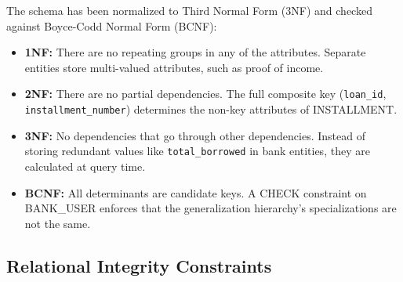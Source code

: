 \documentclass[12pt, a4paper]{report}
\begin{document}
The schema has been normalized to Third Normal Form (3NF) and checked against Boyce-Codd Normal Form (BCNF):

\begin{itemize}[noitemsep]
\item \textbf{1NF:} There are no repeating groups in any of the attributes. Separate entities store multi-valued attributes, such as proof of income.
\item \textbf{2NF:} There are no partial dependencies. The full composite key (\texttt{loan\_id}, \texttt{installment\_number}) determines the non-key attributes of INSTALLMENT.
\item \textbf{3NF:} No dependencies that go through other dependencies. Instead of storing redundant values like \texttt{total\_borrowed} in bank entities, they are calculated at query time.
\item \textbf{BCNF:} All determinants are candidate keys. A CHECK constraint on BANK\_USER enforces that the generalization hierarchy's specializations are not the same.
\end{itemize}

\subsection{Relational Integrity Constraints}
\label{sec:integrity-constraints}
\end{document}
